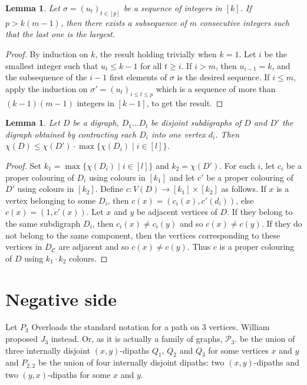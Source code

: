 \documentclass[utf8,10pt]{article}
\theoremstyle{plain}
\newtheorem{lemma}[theorem]{Lemma}
\theoremstyle{definition}
\theoremstyle{remark}
\newcommand{\nathann}[1]{{\color{blue}{\bf Nathann:} #1}}
\begin{document}
\begin{lemma}\label{max}
Let $\sigma=(u_t)_{t\in [p]}$ be a sequence of integers in $[k]$. 
If $p > k (m-1)$, then there exists a subsequence of $m$ consecutive integers such that the
last one is the largest.
\end{lemma}

\begin{proof}
By induction on $k$, the result holding trivially when $k=1$. 
Let $i$ be the smallest integer such that $u_t\leq k-1$ for all $t\geq i$.
If $i>m$, then $u_{i-1}=k$, and the subsequence of the $i-1$ first elements of $\sigma$ is the desired sequence.
If $i\leq m$, apply the induction on $\sigma'=(u_t)_{i\leq t\leq p}$ which is a sequence of more than $(k-1)(m-1)$ integers in $[k-1]$, to get the result. 
\end{proof}

\begin{lemma}\label{lem:contrac}
Let $D$ be a digraph, $D_1 \dots D_l$ be disjoint subdigraphs of $D$ and $D'$ the digraph obtained by contracting each $D_i$ into
one vertex $d_i$. Then $\chi(D) \leq \chi(D')\cdot \max\{\chi(D_i) \mid i \in [l]\}$.
\end{lemma}

\begin{proof}

Set $k_1 = \max\{\chi(D_i) \mid i \in [l]\}$ and $k_2 = \chi(D')$. For each $i$, let $c_i$ be a proper colouring of $D_i$ using colours in $[k_1]$ and let
$c'$ be a proper colouring of $D'$ using colours in $[k_2]$. 
Define $c : V(D) \rightarrow [k_1] \times [k_2]$ as follows. If $x$ is a vertex belonging to some $D_i$, then $c(x) = (c_i(x), c'(d_i))$, else $c(x) =(1,c'(x))$. 
Let $x$ and $y$ be adjacent vertices of $D$. If they belong to the same subdigraph $D_i$, then $c_i(x) \not = c_i(y)$ and so $c(x) \not = c(y)$. If they do not belong
to the same component, then the vertices corresponding to these vertices in $D_{\mathcal{C}}$ are adjacent and so $c(x) \not = c(y)$. 
Thus $c$ is a proper colouring of $D$ using $k_1\cdot k_2$ colours. 
\end{proof}



\section{Negative side}

Let $P_3$ \nathann{Overloads the standard notation for a path on 3 vertices. William proposed $J_3$ instead. Or, as it is actually a family of graphs, $\mathcal P_3$.} be the union of three internally disjoint $(x,y)$-dipaths $Q_1$, $Q_2$ and $Q_3$ for some vertices $x$ and $y$ 
and $P_{2,2}$ be the union of four internally disjoint dipaths: two $(x,y)$-dipaths and two $(y,x)$-dipaths for some $x$ and $y$. 
\end{document}
